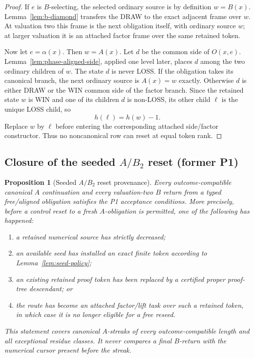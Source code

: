 \documentclass[11pt]{article}
\newtheorem{proposition}[theorem]{Proposition}
\begin{document}
\begin{proof}
If $e$ is $B$-selecting, the selected ordinary source is by definition
$w=B(x)$.  Lemma~\ref{lem:b-diamond} transfers the DRAW to the exact adjacent
frame over $w$.  At valuation two this frame is the next obligation itself,
with ordinary source $w$; at larger valuation it is an attached factor frame
over the same retained token.

Now let $e=\alpha(x)$.  Then $w=A(x)$.  Let $d$ be the common side of
$O(x,e)$.  Lemma~\ref{lem:phase-aligned-side}, applied one level later,
places $d$ among the two ordinary children of $w$.  The state $d$ is never
LOSS.  If the obligation takes its canonical branch, the next ordinary
source is $A(x)=w$ exactly.  Otherwise $d$ is either DRAW or the WIN common
side of the factor branch.  Since the retained state $w$ is WIN and one of
its children $d$ is non-LOSS, its other child $\ell$ is the unique LOSS
child, so
\[
 h(\ell)=h(w)-1.
\]
Replace $w$ by $\ell$ before entering the corresponding attached side/factor
constructor.  Thus no noncanonical row can reset at equal token rank.
\end{proof}

\subsection{Closure of the seeded $A/B_2$ reset (former P1)}

\begin{proposition}[Seeded $A/B_2$ reset provenance]\label{prop:P1-closed}
Every outcome-compatible canonical $A$ continuation and every valuation-two
$B$ return from a typed free/aligned obligation satisfies the P1 acceptance
conditions.  More precisely, before a control reset to a fresh $A$-obligation
is permitted, one of the following has happened:
\begin{enumerate}[label=(\roman*)]
\item a retained numerical source has strictly decreased;
\item an available seed has installed an exact finite token according to
      Lemma~\ref{lem:seed-policy};
\item an existing retained proof token has been replaced by a certified proper
      proof-tree descendant; or
\item the route has become an attached factor/lift task over such a retained
      token, in which case it is no longer eligible for a free reseed.
\end{enumerate}
This statement covers canonical $A$-streaks of every outcome-compatible
length and all exceptional residue classes.  It never compares a final
$B$-return with the numerical cursor present before the streak.
\end{proposition}
\end{document}
